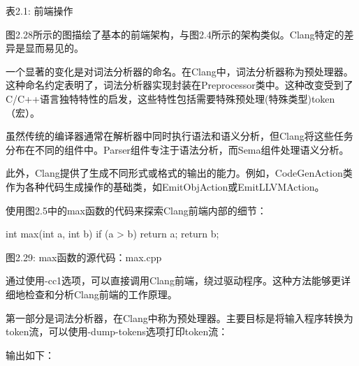 \begin{center}
表2.1: 前端操作
\end{center}


图2.28所示的图描绘了基本的前端架构，与图2.4所示的架构类似。Clang特定的差异是显而易见的。

一个显著的变化是对词法分析器的命名。在Clang中，词法分析器称为预处理器。这种命名约定表明了，词法分析器实现封装在Preprocessor类中。这种改变受到了C/C++语言独特特性的启发，这些特性包括需要特殊预处理(特殊类型)token（宏）。

虽然传统的编译器通常在解析器中同时执行语法和语义分析，但Clang将这些任务分布在不同的组件中。Parser组件专注于语法分析，而Sema组件处理语义分析。

此外，Clang提供了生成不同形式或格式的输出的能力。例如，CodeGenAction类作为各种代码生成操作的基础类，如EmitObjAction或EmitLLVMAction。

使用图2.5中的max函数的代码来探索Clang前端内部的细节：

\begin{cpp}
int max(int a, int b) {
  if (a > b)
    return a;
  return b;
}
\end{cpp}

\begin{center}
图2.29: max函数的源代码：max.cpp
\end{center}

通过使用-cc1选项，可以直接调用Clang前端，绕过驱动程序。这种方法能够更详细地检查和分析Clang前端的工作原理。


第一部分是词法分析器，在Clang中称为预处理器。主要目标是将输入程序转换为token流，可以使用-dump-tokens选项打印token流：


输出如下：

